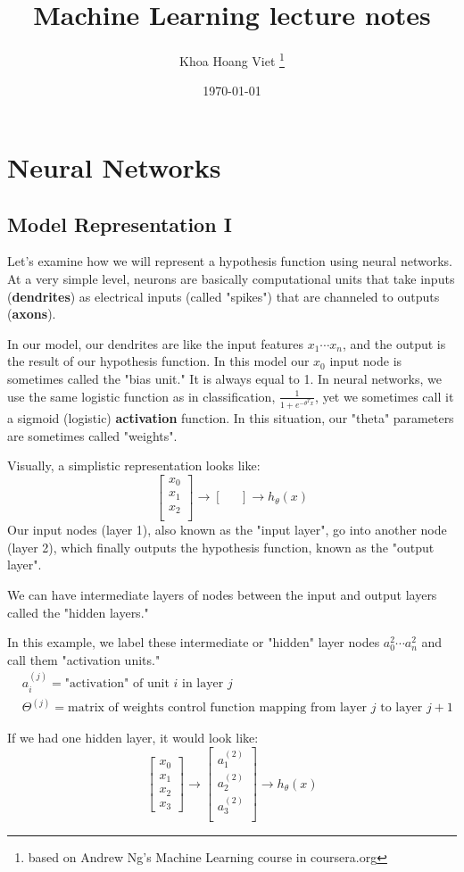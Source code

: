 \documentclass{report}
\title{Machine Learning lecture notes}
\author{Khoa Hoang Viet \thanks{based on Andrew Ng's Machine Learning course in coursera.org}}
\date{\today}
\begin{document}
\section{Neural Networks}
\subsection{Model Representation I}
Let's examine how we will represent a hypothesis function using neural networks. At a very simple level, neurons are basically computational units that take inputs (\textbf{dendrites}) as electrical inputs (called "spikes") that are channeled to outputs (\textbf{axons}). 

In our model, our dendrites are like the input features $x_1\cdots x_n$, and the output is the result of our hypothesis function. In this model our $x_0$ input node is sometimes called the "bias unit." It is always equal to 1. In neural networks, we use the same logistic function as in classification, $\frac{1}{1 + e^{-\theta^Tx}}$, yet we sometimes call it a sigmoid (logistic) \textbf{activation} function. In this situation, our "theta" parameters are sometimes called "weights".

Visually, a simplistic representation looks like:
$$\begin{bmatrix}x_0 \\ x_1 \\ x_2 \\ 
\end{bmatrix}
\rightarrow
\begin{bmatrix}\ \ \ \\ \end{bmatrix}
\rightarrow h_\theta(x)$$
Our input nodes (layer 1), also known as the "input layer", go into another node (layer 2), which finally outputs the hypothesis function, known as the "output layer".

We can have intermediate layers of nodes between the input and output layers called the "hidden layers."

In this example, we label these intermediate or "hidden" layer nodes $a^2_0 \cdots a^2_n$ and call them "activation units."
\begin{align*}
	& a_i^{(j)} = \text{"activation" of unit $i$ in layer $j$} \\
	& \Theta^{(j)} = \text{matrix of weights control function mapping from layer $j$ to layer $j+1$}
\end{align*}

If we had one hidden layer, it would look like:
$$\begin{bmatrix}x_0 \\ x_1 \\ x_2 \\ x_3\end{bmatrix}
\rightarrow
\begin{bmatrix}a_1^{(2)} \\ a_2^{(2)} \\ a_3^{(2)} \\ \end{bmatrix}
\rightarrow h_\theta(x)$$
\end{document}
